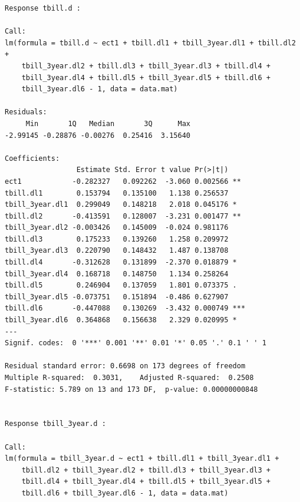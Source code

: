 \documentclass[
  letterpaper,
  DIV=11,
  numbers=noendperiod]{scrartcl}
\newenvironment{Shaded}{\begin{snugshade}}{\end{snugshade}}
\newcommand{\AttributeTok}[1]{\textcolor[rgb]{0.40,0.45,0.13}{#1}}
\newcommand{\CommentTok}[1]{\textcolor[rgb]{0.37,0.37,0.37}{#1}}
\newcommand{\DecValTok}[1]{\textcolor[rgb]{0.68,0.00,0.00}{#1}}
\newcommand{\FunctionTok}[1]{\textcolor[rgb]{0.28,0.35,0.67}{#1}}
\newcommand{\NormalTok}[1]{\textcolor[rgb]{0.00,0.23,0.31}{#1}}
\newcommand{\OtherTok}[1]{\textcolor[rgb]{0.00,0.23,0.31}{#1}}
\newcommand{\SpecialCharTok}[1]{\textcolor[rgb]{0.37,0.37,0.37}{#1}}
\begin{document}
\begin{Shaded}
\end{Shaded}

\begin{verbatim}
Response tbill.d :

Call:
lm(formula = tbill.d ~ ect1 + tbill.dl1 + tbill_3year.dl1 + tbill.dl2 + 
    tbill_3year.dl2 + tbill.dl3 + tbill_3year.dl3 + tbill.dl4 + 
    tbill_3year.dl4 + tbill.dl5 + tbill_3year.dl5 + tbill.dl6 + 
    tbill_3year.dl6 - 1, data = data.mat)

Residuals:
     Min       1Q   Median       3Q      Max 
-2.99145 -0.28876 -0.00276  0.25416  3.15640 

Coefficients:
                 Estimate Std. Error t value Pr(>|t|)    
ect1            -0.282327   0.092262  -3.060 0.002566 ** 
tbill.dl1        0.153794   0.135100   1.138 0.256537    
tbill_3year.dl1  0.299049   0.148218   2.018 0.045176 *  
tbill.dl2       -0.413591   0.128007  -3.231 0.001477 ** 
tbill_3year.dl2 -0.003426   0.145009  -0.024 0.981176    
tbill.dl3        0.175233   0.139260   1.258 0.209972    
tbill_3year.dl3  0.220790   0.148432   1.487 0.138708    
tbill.dl4       -0.312628   0.131899  -2.370 0.018879 *  
tbill_3year.dl4  0.168718   0.148750   1.134 0.258264    
tbill.dl5        0.246904   0.137059   1.801 0.073375 .  
tbill_3year.dl5 -0.073751   0.151894  -0.486 0.627907    
tbill.dl6       -0.447088   0.130269  -3.432 0.000749 ***
tbill_3year.dl6  0.364868   0.156638   2.329 0.020995 *  
---
Signif. codes:  0 '***' 0.001 '**' 0.01 '*' 0.05 '.' 0.1 ' ' 1

Residual standard error: 0.6698 on 173 degrees of freedom
Multiple R-squared:  0.3031,    Adjusted R-squared:  0.2508 
F-statistic: 5.789 on 13 and 173 DF,  p-value: 0.00000000848


Response tbill_3year.d :

Call:
lm(formula = tbill_3year.d ~ ect1 + tbill.dl1 + tbill_3year.dl1 + 
    tbill.dl2 + tbill_3year.dl2 + tbill.dl3 + tbill_3year.dl3 + 
    tbill.dl4 + tbill_3year.dl4 + tbill.dl5 + tbill_3year.dl5 + 
    tbill.dl6 + tbill_3year.dl6 - 1, data = data.mat)


\end{verbatim}
\end{document}
